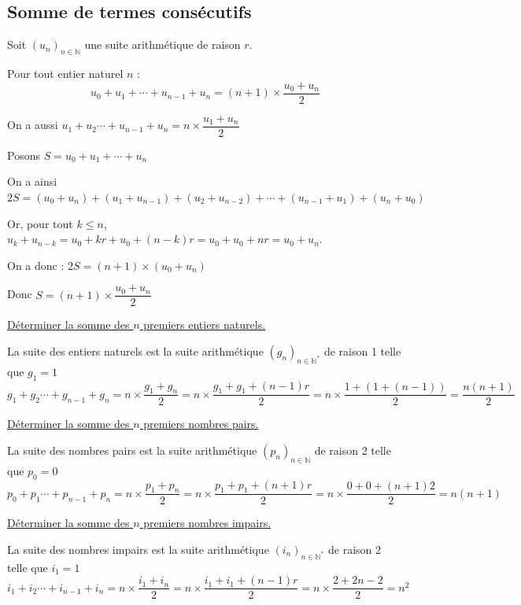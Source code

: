 \documentclass[french]{book}
\newcommand{\N}{\mathbb {N}}
\newcommand{\ie}{\leq}
\newcommand{\suite}[1][u]{\left( #1_{n} \right)_{n\in\N}}
\newcommand{\suitep}[1][u]{\left( #1_{n} \right)_{n\in\N^{*}}}
\begin{document}
\subsection{Somme de termes consécutifs}
\begin{prop}
Soit $\suite[u]$ une suite arithmétique de raison $r$.
\par Pour tout entier naturel $n$ :
\[u_{0}+u_{1}+ \cdots + u_{n-1}+u_{n}=(n+1)\times \dfrac{u_{0}+u_{n}}{2}\]
\end{prop}

\begin{rem}
On a aussi $u_{1}+u_2 \cdots + u_{n-1}+u_{n}=n\times \dfrac{u_{1}+u_{n}}{2}$
\end{rem}

\begin{demo}
\par Posons $S=u_0+u_1+ \cdots +u_n$
\par On a ainsi $2S=(u_0+u_n)+(u_1+u_{n-1})+(u_2+u_{n-2})+ \cdots +(u_{n-1}+u_1)+(u_n+u_0)$
\par Or, pour tout $k\ie n$, $u_k+u_{n-k}=u_0+kr+u_0+(n-k)r=u_0+u_0+nr=u_0+u_n$.
\par On a donc : $2S=(n+1)\times (u_0+u_n)$
\par Donc $S=(n+1)\times \dfrac{u_{0}+u_{n}}{2}$
\end{demo}

\newpage

\begin{exemple}
\underline{Déterminer la somme des $n$ premiers entiers naturels.}

La suite des entiers naturels est la suite arithmétique $\suitep[g]$ de raison 1 telle que $g_1=1$
\begin{equation*}
g_{1}+g_2 \cdots + g_{n-1}+g_{n}=n\times \dfrac{g_{1}+g_{n}}{2}=n\times \dfrac{g_{1}+g_{1}+(n-1)r}{2}=n\times\dfrac{1+(1+(n-1))}{2}=\dfrac{n(n+1)}{2}
\end{equation*}

\underline{Déterminer la somme des $n$ premiers nombres pairs.}

La suite des nombres pairs est la suite arithmétique $\suite[p]$ de raison 2 telle que $p_0=0$
\begin{equation*}
p_{0}+p_1 \cdots + p_{n-1}+p_{n}=n\times \dfrac{p_{1}+p_{n}}{2}=n\times \dfrac{p_{1}+p_{1}+(n+1)r}{2}=n\times\dfrac{0+0+(n+1)2}{2}=n(n+1)
\end{equation*}


\underline{Déterminer la somme des $n$ premiers nombres impairs.}

La suite des nombres impairs est la suite arithmétique $\suitep[i]$ de raison 2 telle que $i_1=1$
\begin{equation*}
i_{1}+i_2 \cdots + i_{n-1}+i_{n}=n\times \dfrac{i_{1}+i_{n}}{2}=n\times \dfrac{i_{1}+i_{1}+(n-1)r}{2}=n\times\dfrac{2+2n-2}{2}=n^2
\end{equation*}
\end{exemple}
\end{document}
